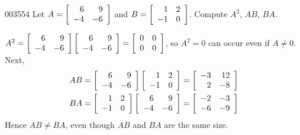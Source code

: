\begin{example}{}{003554}
Let $A = \left[ \begin{array}{rr}
6 & 9 \\
-4 & -6
\end{array} \right]$
 and $B = \left[ \begin{array}{rr}
 1 & 2 \\
 -1 & 0
 \end{array} \right]$. Compute $A^{2}$, $AB$, $BA$.


\begin{solution}
  $A^{2} = \left[ \begin{array}{rr}
  6 & 9 \\
  -4 & -6
  \end{array} \right] \left[ \begin{array}{rr}
  6 & 9 \\
  -4 & -6
  \end{array} \right] = \left[ \begin{array}{rr}
  0 & 0 \\
  0 & 0
  \end{array} \right]$, so $A^{2} = 0$ can occur even if $A \neq 0$. Next,
\begin{align*}
AB & =  \left[ \begin{array}{rr}
6 & 9 \\
-4 & -6
\end{array} \right] \left[ \begin{array}{rr}
1 & 2 \\
-1 & 0
\end{array} \right]  =  \left[ \begin{array}{rr}
-3 & 12 \\
2 & -8
\end{array} \right] \\
BA & =  \left[ \begin{array}{rr}
1 & 2 \\
-1 & 0
\end{array} \right] \left[ \begin{array}{rr}
6 & 9 \\
-4 & -6
\end{array} \right]  =  \left[ \begin{array}{rr}
-2 & -3 \\
-6 & -9
\end{array} \right]
\end{align*}
Hence $AB \neq BA$, even though $AB$ and $BA$ are the same size.
\end{solution}
\end{example}


